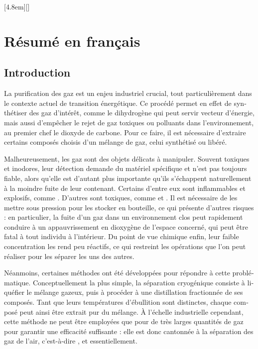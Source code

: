 \documentclass[thesis]{subfiles}
\begin{document}
\begin{otherlanguage}{french}

\renewcommand{\thesection}{\arabic{section}}
\renewcommand{\thesubsection}{\arabic{section}.\arabic{subsection}}
\renewcommand{\thefigure}{R\arabic{figure}}
\setcounter{figure}{0}
[4.8em]{\addvspace{0.1em}}{\contentslabel{2.2em}}{}{\contentspage}[]

\chapter*{Résumé en français}
\startcontents[chapters]
\printpartialtoc
\setcounter{tocdepth}{0}
\setcounter{section}{0}
\clearpage

\section*{Introduction}

La purification des gaz est un enjeu industriel crucial, tout particulièrement dans le contexte actuel de transition énergétique. Ce procédé permet en effet de synthétiser des gaz d'intérêt, comme le dihydrogène qui peut servir vecteur d'énergie, mais aussi d'empêcher le rejet de gaz toxiques ou polluants dans l'environnement, au premier chef le dioxyde de carbone. Pour ce faire, il est nécessaire d'extraire certains composés choisis d'un mélange de gaz, celui synthétisé ou libéré.

Malheureusement, les gaz sont des objets délicats à manipuler. Souvent toxiques et inodores, leur détection demande du matériel spécifique et n'est pas toujours fiable, alors qu'elle est d'autant plus importante qu'ils s'échappent naturellement à la moindre fuite de leur contenant. Certains d'entre eux sont inflammables et explosifs, comme . D'autres sont toxiques, comme  et . Il est nécessaire de les mettre sous pression pour les stocker en bouteille, ce qui présente d'autres risques : en particulier, la fuite d'un gaz dans un environnement clos peut rapidement conduire à un appauvrissement en dioxygène de l'espace concerné, qui peut être fatal à tout individu à l'intérieur. Du point de vue chimique enfin, leur faible concentration les rend peu réactifs, ce qui restreint les opérations que l'on peut réaliser pour les séparer les uns des autres.

Néanmoins, certaines méthodes ont été développées pour répondre à cette problématique. Conceptuellement la plus simple, la séparation cryogénique consiste à liquéfier le mélange gazeux, puis à procéder à une distillation fractionnée de ses composés. Tant que leurs températures d'ébullition sont distinctes, chaque composé peut ainsi être extrait pur du mélange. À l'échelle industrielle cependant, cette méthode ne peut être employées que pour de très larges quantités de gaz pour garantir une efficacité suffisante : elle est donc cantonnée à la séparation des gaz de l'air, c'est-à-dire ,  et  essentiellement.


\end{otherlanguage}
\end{document}
